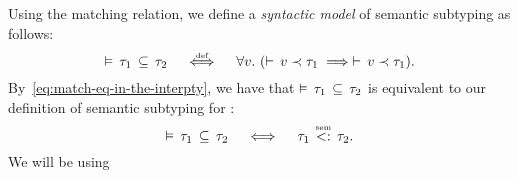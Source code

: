 Using the matching relation, we define a \emph{syntactic model} of
semantic subtyping as follows:
\begin{equation}
\bjsemsub{\ty_1}{\ty_2} \quad \defsign \quad
\forall \vty.\ (\bjmtch{\vty}{\ty_1} \implies \bjmtch{\vty}{\ty_1}).
\end{equation}
By~\ref{eq:match-eq-in-the-interpty}, we have that $\vDash \, \tau_1 \, \subseteq \, \tau_2$
is equivalent to our definition of semantic subtyping for \BetaJulia:
\begin{equation}
\bjsemsub{\ty_1}{\ty_2} \quad \iff \quad \bjtruesemsub{\ty_1}{\ty_2}.
\end{equation}
We will be using